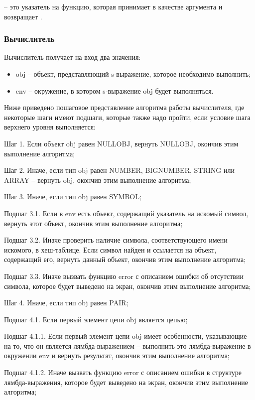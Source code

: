  -- это указатель на функцию, которая принимает  в качестве аргумента и возвращает .

\subsubsection{Вычислитель}

Вычислитель получает на вход два значения:
\begin{itemize}
\item obj -- объект, представляющий s-выражение, которое необходимо выполнить;
\item env -- окружение, в котором s-выражение obj будет выполняться.
\end{itemize}

Ниже приведено пошаговое представление алгоритма работы вычислителя, где некоторые шаги имеют подшаги, которые также надо пройти, если условие шага верхнего уровня выполняется:

Шаг 1. Если объект obj равен NULLOBJ, вернуть NULLOBJ, окончив этим выполнение алгоритма;

Шаг 2. Иначе, если тип obj равен NUMBER, BIGNUMBER, STRING или ARRAY -- вернуть obj, окончив этим выполнение алгоритма;

Шаг 3. Иначе, если тип obj равен SYMBOL;

Подшаг 3.1. Если в env есть объект, содержащий указатель на искомый символ, вернуть этот объект, окончив этим выполнение алгоритма;

Подшаг 3.2. Иначе проверить наличие символа, соответствующего имени искомого, в хеш-таблице. Если символ найден и ссылается на объект, содержащий его, вернуть данный объект, окончив этим выполнение алгоритма;

Подшаг 3.3. Иначе вызвать функцию error с описанием ошибки об отсутствии символа, которое будет выведено на экран, окончив этим выполнение алгоритма;

Шаг 4. Иначе, если тип obj равен PAIR;

Подшаг 4.1. Если первый элемент цепи obj является цепью;

Подшаг 4.1.1. Если первый элемент цепи obj имеет особенности, указывающие на то, что он является лямбда-выражением -- выполнить это лямбда-выражение в окружении env и вернуть результат, окончив этим выполнение алгоритма;

Подшаг 4.1.2. Иначе вызвать функцию error с описанием ошибки в структуре лямбда-выражения, которое будет выведено на экран, окончив этим выполнение алгоритма;

